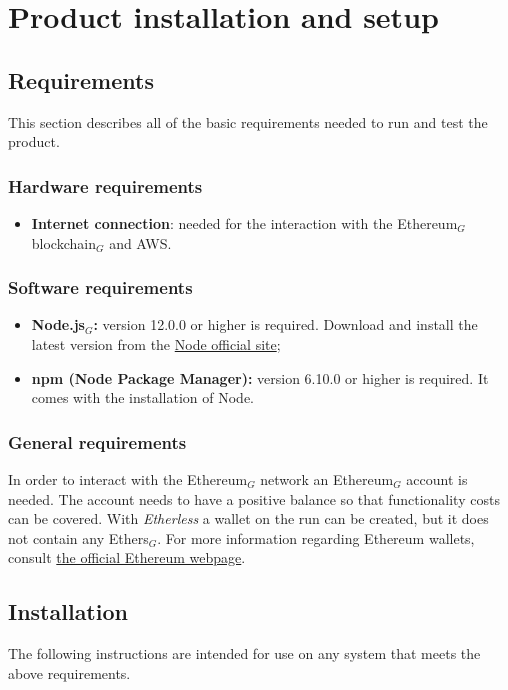 \section{Product installation and setup}
  \subsection{Requirements}
    This section describes all of the basic requirements needed to run and test the product.
    \subsubsection{Hardware requirements}
      \begin{itemize}
      	\item \textbf{Internet connection}: needed for the interaction with the Ethereum$_{G}$ blockchain$_{G}$ and AWS.
      \end{itemize}
    \subsubsection{Software requirements}
      \begin{itemize}
        \item \textbf{Node.js$_{G}$:} version 12.0.0 or higher is required. Download and install the latest version from the \href{https://nodejs.org/it/download/}{Node official site};
        \item \textbf{npm (Node Package Manager):} version 6.10.0 or higher is required. It comes with the installation of Node.
      \end{itemize}
    \subsubsection{General requirements}
      In order to interact with the Ethereum$_{G}$ network an Ethereum$_{G}$ account is needed. The account needs to have a positive balance so that functionality costs can be covered. With \textit{Etherless} a wallet on the run can be created, but it does not contain any Ethers$_{G}$. For more information regarding Ethereum wallets, consult \href{https://ethereum.org/en/wallets/}{the official Ethereum webpage}.
      
  \subsection{Installation}
    The following instructions are intended for use on any system that meets the above requirements.
    
